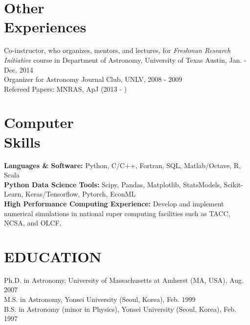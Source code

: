 \documentclass[margin,centered]{res}
\begin{document}
\begin{resume}
\section{Other \\ Experiences} 
Co-instructor, who organizes, mentors, and lectures,  for {\it Freshman Research Initiative} course in Department of Astronomy, University of Texas Austin, Jan. - Dec. 2014  \\
Organizer for Astronomy Journal Club, UNLV, 2008 - 2009 \\
Refereed Papers: MNRAS, ApJ (2013 - )

\section{Computer \\ Skills} 
{\bf Languages \& Software:} Python, C/C++, Fortran, SQL, Matlab/Octave, R, Scala\\
{\bf Python Data Science Tools:} Scipy, Pandas, Matplotlib, StatsModels, Scikit-Learn, Keras/Tensorflow, Pytorch, EconML \\
{\bf High Performance Computing Experience:} Develop and implement numerical simulations in national super computing facilities such as TACC, NCSA, and OLCF.

\section{EDUCATION} 
Ph.D. in Astronomy, University of Massachusetts at Amherst (MA, USA), Aug. 2007 \\
M.S. in Astronomy, Yonsei University (Seoul, Korea), Feb. 1999 \\
B.S. in Astronomy (minor in Physics), Yonsei University (Seoul, Korea), Feb. 1997 \\



\end{resume}
\end{document}
